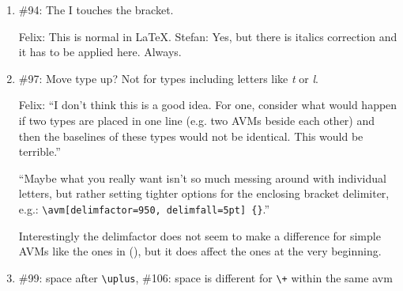 \documentclass[output=book
		,modfonts
		,nonflat
	        ,collection
	        ,collectionchapter
	        ,collectiontoclongg
 	        ,biblatex  
                ,babelshorthands
                ,newtxmath
                ,colorlinks, citecolor=brown 
                ,draftmode
		  ]{langscibook}
\begin{document}
\begin{enumerate}
I want both AVMs to appear at the top right below the heading. \verb+\attop+ does not work since it puts the following AVM on the next line.
\ea
\label{entryfori}
Simplified lexical signs for  \textit{I} and \textit{she}: \\*
\hspace{1cm}
\z
Felix provided solution with minipage, but could there be an option for calling \verb+\avm+? And if
so, could forest enable this by default?


\item \#94: The I touches the bracket.

\ea
{}
\z

Felix: This is normal in \LaTeX. Stefan: Yes, but there is italics correction and it has to be
applied here. Always.


\item \#97: Move type up? Not for types including letters like \emph{t} or \emph{l}.

\ea
\z

Felix: ``I don't think this is a good idea. For one, consider what would happen if two types are
placed in one line (e.g. two AVMs beside each other) and then the baselines of these types would not
be identical. This would be terrible.''

``Maybe what you really want isn't so much messing around with individual letters, but rather setting tighter options for the enclosing bracket delimiter, e.g.: \verb+\avm[delimfactor=950, delimfall=5pt] {}+.''

Interestingly the delimfactor does not seem to make a difference for simple AVMs like the ones in
(), but it does affect the ones at the very beginning.


\item \#99: space after \verb+\uplus+, \#106: space is different for \verb-\+- within the same avm



\end{enumerate}
\end{document}
